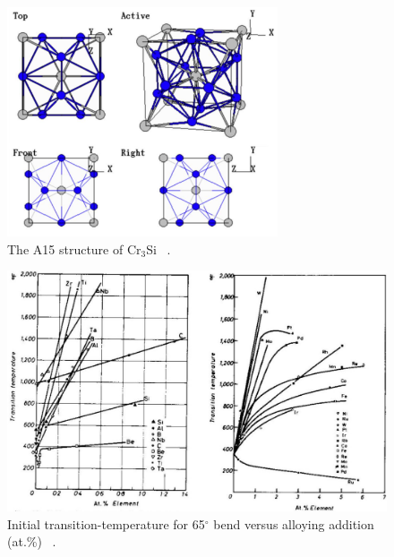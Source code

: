 %
\begin{figure}[H]
\begin{center}
\includegraphics[width=8cm]{A15}
\caption{The A15 structure of Cr$_3$Si ~\cite{nevitt95}.}\label{fig:A15}
\end{center}
\end{figure}
% 
%
\begin{figure}[H]
\begin{center}
\includegraphics[width=.98\textwidth]{Cr_ductility}
\vspace{-2mm}
\caption{Initial transition-temperature for 65$^\circ$ bend versus alloying addition (at.\%) ~\cite{abrahamson57}. }\label{fig:Cr_ductility}
\end{center}
\end{figure}
\vspace{-8mm}
%
%
